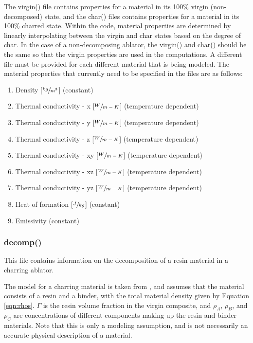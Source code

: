 \documentclass[]{article}
\begin{document}
The virgin() file contains properties for a material in its 100\% virgin (non-decomposed) state, and the char() files contains properties for a material in its 100\% charred state.  Within the code, material properties are determined by linearly interpolating between the virgin and char states based on the degree of char. In the case of a non-decomposing ablator, the virgin() and char() should be the same so that the virgin properties are used in the computations. A different file must be provided for each different material that is being modeled. The material properties that currently need to be specified in the files are as follows:
\begin{enumerate}
	\item Density [\(\sfrac{kg}{m^3}\)] (constant)
	\item Thermal conductivity - x [\(\sfrac{W}{m-K}\)] (temperature dependent)
	\item Thermal conductivity - y [\(\sfrac{W}{m-K}\)] (temperature dependent)
	\item Thermal conductivity - z [\(\sfrac{W}{m-K}\)] (temperature dependent)
	\item Thermal conductivity - xy [\(\sfrac{W}{m-K}\)] (temperature dependent)
	\item Thermal conductivity - xz [\(\sfrac{W}{m-K}\)] (temperature dependent)
	\item Thermal conductivity - yz [\(\sfrac{W}{m-K}\)] (temperature dependent)
	\item Heat of formation [\(\sfrac{J}{kg}\)] (constant)
	\item Emissivity (constant)
\end{enumerate}

\subsubsection{decomp()}
This file contains information on the decomposition of a resin material in a charring ablator. 

The model for a charring material is taken from \cite{amar_thesis}, and assumes that the material consists of a resin and a binder, with the total material density given by Equation \ref{eqn:rhos}. \(\Gamma\) is the resin volume fraction in the virgin composite, and \(\rho_A\), \(\rho_B\), and \(\rho_C\) are concentrations of different components making up the resin and binder materials. Note that this is only a modeling assumption, and is not necessarily an accurate physical description of a material.
\end{document}
